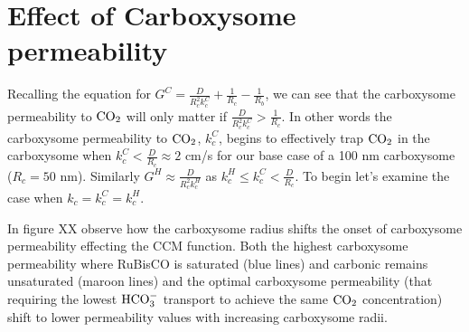 \documentclass[]{article}
\begin{document}
\section{Effect of Carboxysome permeability}


Recalling the equation for $G^C = \frac{D}{R_c^2 k_c^C} + \frac{1}{R_c}-\frac{1}{R_b}$, we can see that the carboxysome permeability to  ${\rm CO_2}$ will only matter if $ \frac{D}{R_c^2 k_c^C} >\frac{1}{R_c}$. In other words the carboxysome permeability to ${\rm CO_2}$, $k_c^C$, begins to effectively trap ${\rm CO_2}$ in the carboxysome when $k_c^C < \frac{D}{R_c} \approx 2$ cm/s for our base case of a 100 nm carboxysome ($R_c = 50$ nm). Similarly $G^H \approx \frac{D}{R_c^2 k_c^H}$ as $k_c^H \leq k_c^C < \frac{D}{R_c}$. To begin let's examine the case when $k_c = k_c^C = k_c^H$.

In figure XX observe how the carboxysome radius shifts the onset of carboxysome permeability effecting the CCM function. Both the highest carboxysome permeability where RuBisCO is saturated (blue lines) and carbonic remains unsaturated (maroon lines) and the optimal carboxysome permeability (that requiring the lowest ${\rm HCO_3^-}$ transport to achieve the same ${\rm CO_2}$ concentration) shift to lower permeability values with increasing carboxysome radii.
\end{document}
